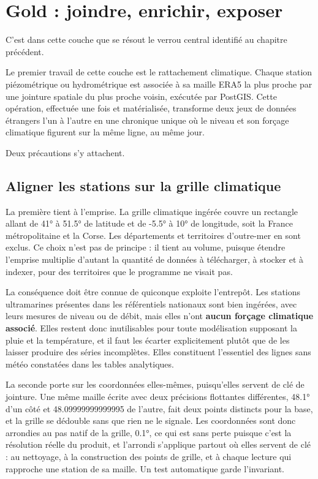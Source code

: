 \section{Gold : joindre, enrichir, exposer}

C'est dans cette couche que se résout le verrou central identifié au chapitre précédent.

Le premier travail de cette couche est le rattachement climatique. Chaque station
piézométrique ou hydrométrique est associée à sa maille ERA5 la plus proche par une jointure spatiale du plus proche voisin,
exécutée par PostGIS. Cette opération, effectuée
une fois et matérialisée, transforme deux jeux de données étrangers l'un à l'autre en une
chronique unique où le niveau et son forçage climatique figurent sur la même ligne, au même
jour.

Deux précautions s'y attachent.

\subsection{Aligner les stations sur la grille climatique}

La première tient à l'emprise. La grille climatique ingérée couvre un rectangle allant de \ang{41} à \ang{51.5} de latitude et de \ang{-5.5} à \ang{10} de longitude, soit la
France métropolitaine et la Corse. Les départements et territoires d'outre-mer en sont exclus.
Ce choix n'est pas de principe : il tient au volume, puisque étendre l'emprise multiplie d'autant
la quantité de données à télécharger, à stocker et à indexer, pour des territoires que le
programme ne visait pas.

La conséquence doit être connue de quiconque exploite l'entrepôt. Les stations ultramarines
présentes dans les référentiels nationaux sont bien ingérées, avec leurs mesures de niveau ou de
débit, mais elles n'ont \textbf{aucun forçage climatique associé}. Elles restent donc
inutilisables pour toute modélisation supposant la pluie et la température, et il faut les
écarter explicitement plutôt que de les laisser produire des séries incomplètes. Elles
constituent l'essentiel des lignes sans météo constatées dans les tables analytiques.

La seconde porte sur les coordonnées elles-mêmes, puisqu'elles servent de clé de jointure. Une
même maille écrite avec deux précisions flottantes différentes, \ang{48.1} d'un côté et
\num{48.09999999999995} de l'autre, fait deux points distincts pour la base, et la grille se
dédouble sans que rien ne le signale. Les coordonnées sont donc arrondies au pas natif de la
grille, \ang{0.1}, ce qui est sans perte puisque c'est la résolution réelle du produit, et
l'arrondi s'applique partout où elles servent de clé : au nettoyage, à la construction des
points de grille, et à chaque lecture qui rapproche une station de sa maille. Un test automatique
garde l'invariant.


